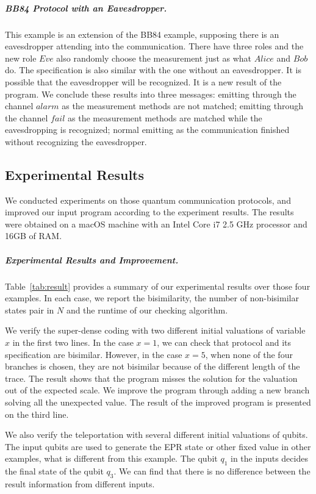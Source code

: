 \documentclass[a4paper,UKenglish,cleveref, autoref]{lipics-v2019}
\begin{document}
\subparagraph*{BB84 Protocol with an Eavesdropper.} This example is an extension of the BB84 example, supposing there is an eavesdropper attending into the communication. There have three roles and the new role $Eve$ also randomly choose the measurement just as what $Alice$ and $Bob$ do. The specification is also similar with the one without an eavesdropper. It is possible that the eavesdropper will be recognized. It is a new result of the program. We conclude these results into three messages: emitting through the channel $alarm$ as the measurement methods are not matched; emitting through the channel $fail$ as the measurement methods are matched while the eavesdropping is recognized; normal emitting as the communication finished without recognizing the eavesdropper.
\subsection{Experimental Results}
We conducted experiments on those quantum communication protocols, and improved our input program according to the experiment results. The results were obtained on a macOS machine with an Intel Core i7 2.5 GHz processor and 16GB of RAM.
\subparagraph*{Experimental Results and Improvement.}Table~\ref{tab:result} provides a summary of our experimental results over those four examples. In each case, we report the bisimilarity, the number of non-bisimilar states pair in $N$ and the runtime of our checking algorithm.

We verify the super-dense coding with two different initial valuations of variable $x$ in the first two lines. In the case $x=1$, we can check that protocol and its specification are bisimilar. However, in the case $x=5$, when none of the four branches is chosen, they are not bisimilar because of the different length of the trace. The result shows that the program misses the solution for the valuation out of the expected scale. We improve the program through adding a new branch solving all the unexpected value. The result of the improved program is presented on the third line. 

We also verify the teleportation with several different initial valuations of qubits. The input qubits are used to generate the EPR state or other fixed value in other examples, what is different from this example. The qubit $q_1$ in the inputs decides the final state of the qubit $q_3$. We can find that there is no difference between the result information from different inputs.
\end{document}
